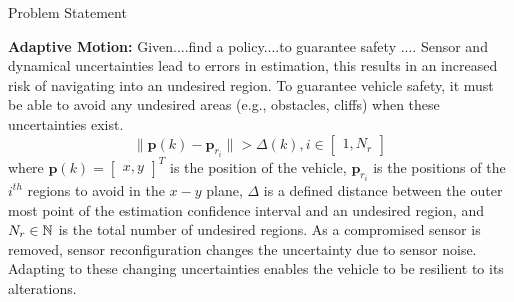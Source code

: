 \begin{section}{Problem Statement}
	
\begin{problem} \label{problem2} {\textbf{Adaptive Motion:}} 
Given....find a policy....to guarantee safety ....
Sensor and dynamical uncertainties lead to errors in estimation, this results in an increased risk of navigating into an undesired region. To guarantee vehicle safety, it must be able to avoid any undesired areas (e.g., obstacles, cliffs) when these uncertainties exist.
	\begin{equation}
		\lVert {\bm{p}(k)-\bm{p}_{r_i}} \rVert >\Delta(k),  i \in \begin{bmatrix} 1,N_r \end{bmatrix}
	\end{equation}
where $\bm{p}(k)={\begin{bmatrix} x,y \end{bmatrix}}^T$ is the position of the vehicle, $\bm{p}_{r_i}$ is the positions of the ${i}^{th}$ regions to avoid in the $x-y$ plane, $\Delta$ is a defined distance between the outer most point of the estimation confidence interval and an undesired region, and $N_r \in \mathbb{N}$ is the total number of undesired regions. As a compromised sensor is removed, sensor reconfiguration changes the uncertainty due to sensor noise. Adapting to these changing uncertainties enables the vehicle to be resilient to its alterations.


	
\end{problem}

\end{section}